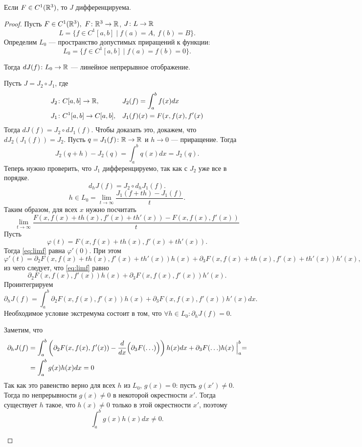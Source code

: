 \begin{prac}
Если $ F \in C^{1}(\mathbb{R}^3)$, то $ J$  дифференцируема.
\end{prac}
\begin{proof}
	Пусть $ F \in C^{1}(\mathbb{R}^3), ~ F\colon \mathbb{R}^3 \to  \mathbb{R}$, $ J\colon L \to \mathbb{R}$
	\[
		L = \{f \in C^{1}[a, b]\mid f(a)  = A,~ f(b) = B\}
	.\] 
Определим $ L_0 $ --- пространство  допустимых приращений к функции:
\[
	L_0 = \{f \in  C^{1}[a, b] \mid f(a) = f(b) = 0\}
.\] 

Тогда $ dJ(f)\colon L_0 \to  \mathbb{R}$ --- линейное непрерывное отображение.

Пусть $ J = J_2 \circ J_1 $, где 
\[
\begin{aligned}
	J_2 &\colon C[a, b] \to  \mathbb{R}, &&J_2(f) = \int_{a}^{b} f(x)dx \\
	J_1 &\colon C^{1}[a, b] \to C[a, b], && J_1(f)(x) = F(x, f(x), f'(x)
\end{aligned}
\]
Тогда $ dJ(f) = J_2 \circ d J_1(f)$. Чтобы доказать это, докажем, что $ dJ_2(J_1(f)) = J_2$. Пусть $ q = J_1(f)\colon \mathbb{R} \to  \mathbb{R}$ и $ h \to  0$ --- приращение. Тогда
\[
	J_2(q + h) - J_2(q) = \int_{a}^{b} q(x)dx = J_2(q) 
.\] 
Теперь нужно проверить, что $ J_1$ дифференцируемо, так как с $ J_2$ уже все в порядке.
\[
	d_hJ(f) = J_2 \circ d_hJ_1(f)
.\] 
\[
	h \in L_0 = \lim_{t \to  \infty} \frac{J_1(f+th)-J_1(f)}{t}
.\] 
Таким образом, для всех $ x$  нужно посчитать 
\begin{equation}\label{eq:limf}
	\lim_{t \to  \infty} \frac{F(x, f(x) + th(x), f'(x) + th'(x) ) - F(x, f(x) , f'(x))}{t}
\end{equation}
Пусть 
\[
	\varphi (t) = F(x, f(x) +th(x), f'(x)+th'(x))
.\] 
Тогда \ref{eq:limf} равна $ \varphi '(0)$.
При этом 
\[
	\varphi '(t) = \partial _2 F(x, f(x) + th(x), f'(x)+th'(x))h(x) + \partial _3 F(x, f(x)+th(x), f'(x)+th'(x))h'(x)
,\] 
из чего следует, что
\ref{eq:limf} равно
\[
	\partial _2 F(x, f(x), f'(x))h(x) + \partial _3 F(x, f(x), f'(x))h'(x)
.\] 
Проинтегрируем
\[
	\partial _hJ(f) = \int_{a}^{b} \partial _2 F(x, f(x), f'(x))h(x) + \partial _3 F(x, f(x), f'(x))h'(x) dx  
.\] 
Необходимое условие экстремума состоит в том, что $ \forall h \in L_0\colon \partial _h J(f) = 0$.

Заметим, что
\[
\begin{aligned}
	\partial _h J(f) &= \int_{a}^{b} \left( \partial _2F(x, f(x), f'(x)) - \frac{d}{dx} \Bigl( \partial _3 F(\ldots )\Bigr) \right)h(x) dx + \partial _3 F(\ldots ) h(x) \Bigm|_{a}^{b} = \\
					 &=\int_{a}^{b} g(x)h(x) dx = 0
\end{aligned}
\]
Так как это равенство верно для всех $ h$ из $ L_0$, $ g(x) = 0$: пусть  $ g(x') \ne 0$. Тогда по непрерывности $ g(x) \ne 0$ в некоторой окрестности $ x'$. Тогда существует $ h$ такое, что  $ h(x) \ne  0$ только в этой окрестности $ x'$, поэтому
 \[
	 \int_{a}^{b} g(x)h(x)dx \ne 0 
.\] 
\begin{figure}[ht]
    \centering
    \label{fig:proff-g-is-zero}
\end{figure}


\end{proof}

